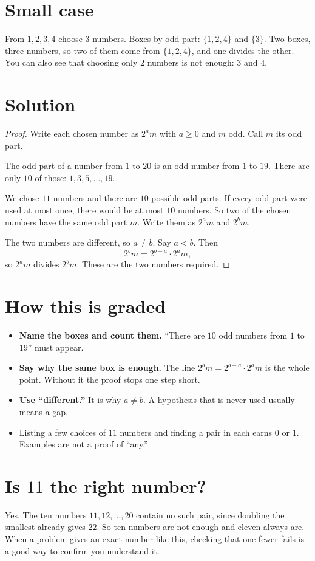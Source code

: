 \documentclass[11pt]{article}
\begin{document}
\section*{Small case}
From $1, 2, 3, 4$ choose $3$ numbers. Boxes by odd part: $\{1, 2, 4\}$ and $\{3\}$. Two boxes, three numbers, so two of them come from $\{1, 2, 4\}$, and one divides the other. You can also see that choosing only $2$ numbers is not enough: $3$ and $4$.

\section*{Solution}
\begin{proof}
Write each chosen number as $2^a m$ with $a \ge 0$ and $m$ odd. Call $m$ its odd part.

The odd part of a number from $1$ to $20$ is an odd number from $1$ to $19$. There are only $10$ of those: $1, 3, 5, \dots, 19$.

We chose $11$ numbers and there are $10$ possible odd parts. If every odd part were used at most once, there would be at most $10$ numbers. So two of the chosen numbers have the same odd part $m$. Write them as $2^a m$ and $2^b m$.

The two numbers are different, so $a \ne b$. Say $a < b$. Then
\[ 2^b m = 2^{b-a} \cdot 2^a m, \]
so $2^a m$ divides $2^b m$. These are the two numbers required.
\end{proof}

\section*{How this is graded}
\begin{itemize}
  \item \textbf{Name the boxes and count them.} ``There are $10$ odd numbers from $1$ to $19$'' must appear.
  \item \textbf{Say why the same box is enough.} The line $2^b m = 2^{b-a} \cdot 2^a m$ is the whole point. Without it the proof stops one step short.
  \item \textbf{Use ``different.''} It is why $a \ne b$. A hypothesis that is never used usually means a gap.
  \item Listing a few choices of $11$ numbers and finding a pair in each earns $0$ or $1$. Examples are not a proof of ``any.''
\end{itemize}

\section*{Is $11$ the right number?}
Yes. The ten numbers $11, 12, \dots, 20$ contain no such pair, since doubling the smallest already gives $22$. So ten numbers are not enough and eleven always are. When a problem gives an exact number like this, checking that one fewer fails is a good way to confirm you understand it.
\end{document}
